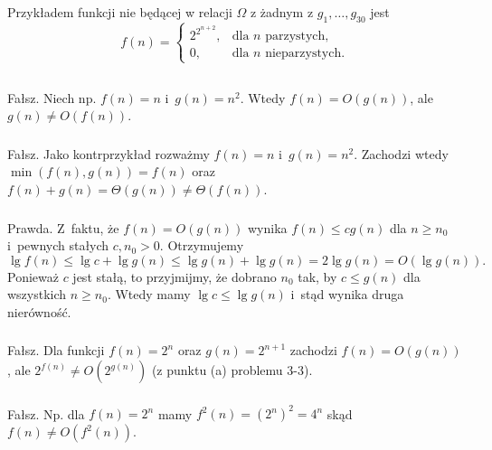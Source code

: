 \subsubsection{} %
Przykładem funkcji nie będącej w relacji $\Omega$ z żadnym z $g_1,\dots,g_{30}$ jest
\[
	f(n)=\left\{\begin{array}{ll}
		2^{2^{n+2}}, & \mbox{dla }n\mbox{ parzystych,} \\
		0, & \mbox{dla }n\mbox{ nieparzystych}.
	\end{array}\right.
\]

\subsection{} %

\subsubsection{} %
Fałsz. Niech np. $f(n)=n$ i~$g(n)=n^2$. Wtedy $f(n)=O(g(n))$, ale $g(n)\ne O(f(n))$.

\subsubsection{} %
Fałsz. Jako kontrprzykład rozważmy $f(n)=n$ i~$g(n)=n^2$. Zachodzi wtedy $\min(f(n),g(n))=f(n)$ oraz $f(n)+g(n)=\Theta(g(n))\ne\Theta(f(n))$.

\subsubsection{} %
Prawda. Z~faktu, że $f(n)=O(g(n))$ wynika $f(n)\le cg(n)$ dla $n\ge n_0$ i~pewnych stałych $c,n_0>0$. Otrzymujemy
\[
	\lg f(n)\le\lg c+\lg g(n)\le \lg g(n)+\lg g(n) = 2\lg g(n) = O(\lg g(n)).
\]
Ponieważ $c$ jest stałą, to przyjmijmy, że dobrano $n_0$ tak, by $c\le g(n)$ dla wszystkich $n\ge n_0$. Wtedy mamy $\lg c\le\lg g(n)$ i~stąd wynika druga nierówność.

\subsubsection{} %
Fałsz. Dla funkcji $f(n)=2^n$ oraz $g(n)=2^{n+1}$ zachodzi $f(n)=O(g(n))$, ale $2^{f(n)}\ne O\left(2^{g(n)}\right)$ (z punktu (a) problemu 3-3).

\subsubsection{} %
Fałsz. Np. dla $f(n)=2^n$ mamy $f^2(n)=(2^n)^2=4^n$ skąd $f(n)\ne O\left(f^2(n)\right)$.

